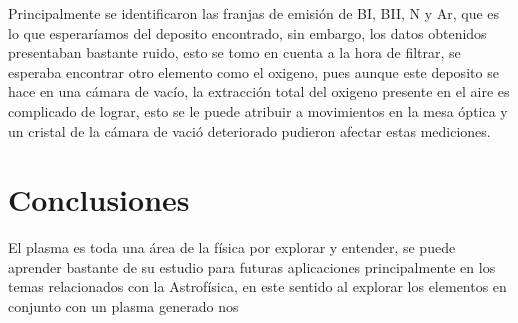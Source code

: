 \documentclass[12pt]{IEEEtran}
\begin{document}
Principalmente se identificaron las franjas de emisión de BI, BII, N y Ar, que es lo que esperaríamos del deposito encontrado, sin embargo, los datos obtenidos presentaban bastante ruido, esto se tomo en cuenta a la hora de filtrar, se esperaba encontrar otro elemento como el oxigeno, pues aunque este deposito se hace en una cámara de vacío, la extracción total del oxigeno presente en el aire es complicado de lograr, esto se le puede atribuir a movimientos en la mesa óptica y un cristal de la cámara de vació deteriorado pudieron afectar estas mediciones.


\section{Conclusiones}
El plasma es toda una área de la física por explorar y entender, se puede aprender bastante de su estudio para futuras aplicaciones principalmente en los temas relacionados con la Astrofísica, en este sentido al explorar los elementos en conjunto con un plasma generado nos



\nocite{*}
\printbibliography
\end{document}
